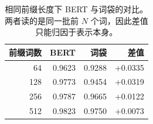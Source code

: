 \begin{table}[t]
\centering
\footnotesize
\caption{相同前缀长度下 BERT 与词袋的对比。两者读的是同一批前 $N$ 个词，因此差值只能归因于表示本身。}
\label{tab:prefix}
\begin{tabular}{rrrr}
\toprule
前缀词数 & BERT & 词袋 & 差值 \\
\midrule
64 & 0.9623 & 0.9288 & +0.0335 \\
128 & 0.9773 & 0.9454 & +0.0319 \\
256 & 0.9787 & 0.9665 & +0.0122 \\
512 & 0.9823 & 0.9750 & +0.0073 \\
\bottomrule
\end{tabular}
\end{table}

